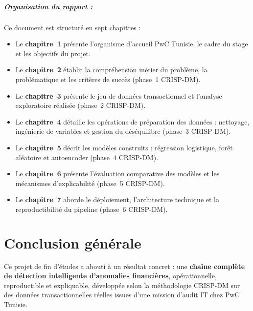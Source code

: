 \documentclass[12pt,a4paper,twoside]{report}
\begin{document}
\paragraph{Organisation du rapport :} Ce document est structuré en sept chapitres :
\begin{itemize}
  \item Le \textbf{chapitre~1} présente l'organisme d'accueil PwC Tunisie, le cadre du
    stage et les objectifs du projet.
  \item Le \textbf{chapitre~2} établit la compréhension métier du problème, la
    problématique et les critères de succès (phase~1 CRISP-DM).
  \item Le \textbf{chapitre~3} présente le jeu de données transactionnel et l'analyse
    exploratoire réalisée (phase~2 CRISP-DM).
  \item Le \textbf{chapitre~4} détaille les opérations de préparation des données :
    nettoyage, ingénierie de variables et gestion du déséquilibre (phase~3 CRISP-DM).
  \item Le \textbf{chapitre~5} décrit les modèles construits : régression logistique,
    forêt aléatoire et autoencoder (phase~4 CRISP-DM).
  \item Le \textbf{chapitre~6} présente l'évaluation comparative des modèles et les
    mécanismes d'explicabilité (phase~5 CRISP-DM).
  \item Le \textbf{chapitre~7} aborde le déploiement, l'architecture technique et la
    reproductibilité du pipeline (phase~6 CRISP-DM).
\end{itemize}









\chapter*{Conclusion générale}

Ce projet de fin d'études a abouti à un résultat concret : une \textbf{chaîne complète de
détection intelligente d'anomalies financières}, opérationnelle, reproductible et
expliquable, développée selon la méthodologie CRISP-DM sur des données transactionnelles
réelles issues d'une mission d'audit IT chez PwC Tunisie.
\end{document}
